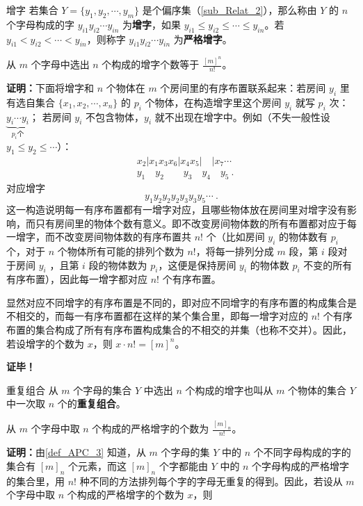 \begin{definition}{增字}
若集合 $Y=\{y_1,y_2,\cdots,y_m\}$ 是个偏序集（\autoref{sub_Relat_2}），那么称由 $Y$ 的 $n$ 个字母构成的字 $y_{i1}y_{i2}\cdots y_{in}$ 为\textbf{增字}，如果 $y_{i1}\leq y_{i2}\leq\cdots\leq y_{in}$。若 $y_{i1}<y_{i2}<\cdots<y_{in}$，则称字 $y_{i1}y_{i2}\cdots y_{in}$ 为\textbf{严格增字}。
\end{definition}
\begin{theorem}{}\label{the_APC_4}
从 $m$ 个字母中选出 $n$ 个构成的增字个数等于 $\frac{[m]^n}{n!}$。
\end{theorem}
\textbf{证明：}下面将增字和 $n$ 个物体在 $m$ 个房间里的有序布置联系起来：若房间 $y_i$ 里有选自集合 $\{x_1,x_2,\cdots,x_n\}$ 的 $p_i$ 个物体，在构造增字里这个房间 $y_i$ 就写 $p_i$ 次：$\underbrace{y_i\cdots y_i}_{p_i\text{个}}$；
若房间 $y_i$ 不包含物体，$y_i$ 就不出现在增字中。例如（不失一般性设 $y_1\leq y_2\leq\cdots$）：
\begin{equation}
\begin{aligned}
&x_2| x_1 x_3 x_6|x_4 x_5|\quad|x_7\cdots\\
&y_1\quad y_2\qquad y_3\quad y_4\quad y_5~.
\end{aligned}
\end{equation}
对应增字
\begin{equation}
y_1y_2y_2y_2y_3y_3y_5\cdots~.
\end{equation}
这一构造说明每一有序布置都有一增字对应，且哪些物体放在房间里对增字没有影响，而只有房间里的物体个数有意义。即不改变房间物体数的所有布置都对应于每一增字，而不改变房间物体数的有序布置共 $n!$ 个（比如房间 $y_i$ 的物体数有 $p_i$ 个，对于 $n$ 个物体所有可能的排列个数为 $n!$，将每一排列分成 $m$ 段，第 $i$ 段对于房间 $y_i$ ，且第 $i$ 段的物体数为 $p_i$，这便是保持房间 $y_i$ 的物体数 $p_i$ 不变的所有有序布置），因此每一增字都对应 $n!$ 个有序布置。

显然对应不同增字的有序布置是不同的，即对应不同增字的有序布置的构成集合是不相交的，而每一有序布置都在这样的某个集合里，即每一增字对应的 $n!$ 个有序布置的集合构成了所有有序布置构成集合的不相交的并集（也称不交并）。因此，若设增字的个数为 $x$，则 $x\cdot n!=[m]^n$。

\textbf{证毕！}

\begin{definition}{重复组合}\label{def_APC_4}
从 $m$ 个字母的集合 $Y$ 中选出 $n$ 个构成的增字也叫从 $m$ 个物体的集合 $Y$ 中一次取 $n$ 个的\textbf{重复组合}。
\end{definition}

\begin{theorem}{}\label{the_APC_3}
从 $m$ 个字母中取 $n$ 个构成的严格增字的个数为 $\frac{[m]_n}{n!}$。
\end{theorem}
\textbf{证明：}由\autoref{def_APC_3} 知道，从 $m$ 个字母的集 $Y$ 中的 $n$ 个不同字母构成的字的集合有 $[m]_n$ 个元素，而这 $[m]_n$ 个字都能由 $Y$ 中的 $n$ 个字母构成的严格增字的集合里，用 $n!$ 种不同的方法排列每个字的字母无重复的得到。因此，若设从 $m$ 个字母中取 $n$ 个构成的严格增字的个数为 $x$，则

